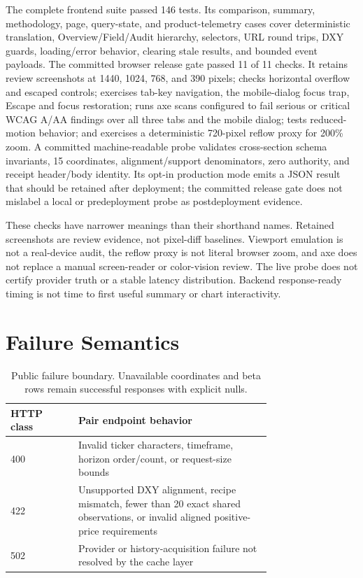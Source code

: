 \documentclass{article}
\begin{document}
The complete frontend suite passed 146 tests. Its comparison, summary,
methodology, page, query-state, and product-telemetry cases cover deterministic
translation, Overview/Field/Audit hierarchy, selectors, URL round trips, DXY
guards, loading/error behavior, clearing stale results, and bounded event
payloads. The committed browser release gate passed 11 of 11 checks. It retains
review screenshots at 1440,
1024, 768, and 390 pixels; checks horizontal overflow and escaped controls;
exercises tab-key navigation, the mobile-dialog focus trap, Escape and focus
restoration; runs axe scans configured to fail serious or critical WCAG A/AA
findings over all three tabs and the mobile dialog; tests reduced-motion
behavior; and exercises a deterministic 720-pixel reflow proxy for 200\% zoom.
A committed machine-readable probe validates cross-section schema invariants,
15 coordinates, alignment/support denominators, zero authority, and receipt
header/body identity. Its opt-in production mode emits a JSON result that
should be retained after deployment; the committed release gate does not
mislabel a local or predeployment probe as postdeployment evidence.

These checks have narrower meanings than their shorthand names. Retained
screenshots are review evidence, not pixel-diff baselines. Viewport emulation is
not a real-device audit, the reflow proxy is not literal browser zoom, and axe
does not replace a manual screen-reader or color-vision review. The live probe
does not certify provider truth or a stable latency distribution. Backend
response-ready timing is not time to first useful summary or chart
interactivity.

\section{Failure Semantics}

\begin{table}[h]
\centering
\small
\setlength{\tabcolsep}{4pt}
\begin{tabular}{lp{0.74\linewidth}}
\toprule
HTTP class & Pair endpoint behavior \\
\midrule
400 & Invalid ticker characters, timeframe, horizon order/count, or request-size bounds \\
422 & Unsupported DXY alignment, recipe mismatch, fewer than 20 exact shared observations, or invalid aligned positive-price requirements \\
502 & Provider or history-acquisition failure not resolved by the cache layer \\
\bottomrule
\end{tabular}
\caption{Public failure boundary. Unavailable coordinates and beta rows remain successful responses with explicit nulls.}
\end{table}
\end{document}
